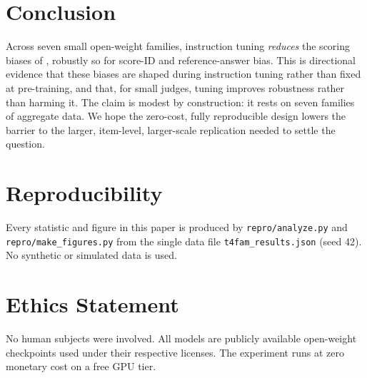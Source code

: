 \documentclass[11pt]{article}
\begin{document}
\section{Conclusion}
Across seven small open-weight families, instruction tuning \emph{reduces} the
scoring biases of \citet{li2025scoring}, robustly so for score-ID and
reference-answer bias. This is directional evidence that these biases are shaped
during instruction tuning rather than fixed at pre-training, and that, for small
judges, tuning improves robustness rather than harming it. The claim is modest by
construction: it rests on seven families of aggregate data. We hope the
zero-cost, fully reproducible design lowers the barrier to the larger,
item-level, larger-scale replication needed to settle the question.

\section*{Reproducibility}
Every statistic and figure in this paper is produced by
\texttt{repro/analyze.py} and \texttt{repro/make\_figures.py} from the single
data file \texttt{t4fam\_results.json} (seed 42). No synthetic or simulated data
is used.

\section*{Ethics Statement}
No human subjects were involved. All models are publicly available open-weight
checkpoints used under their respective licenses. The experiment runs at zero
monetary cost on a free GPU tier.



\end{document}
